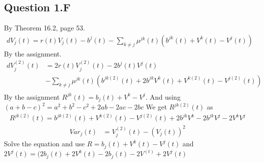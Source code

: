\documentclass[10pt]{article}
\begin{document}
\subsection{Question 1.F}
By Theorem 16.2, page 53. 
\begin{equation}
\begin{split}
dV_j(t) = r(t)V_j(t) - b^j(t) - \sum_{k \neq j} \mu^{jk}(t) (b^{jk}(t) + V^k(t) - V^j(t))
\end{split}
\end{equation}
By the assignment.
\begin{equation}
\begin{split}
dV_j^{(2)}(t) & = 
 2r(t)V_j^{(2)}(t) - 2b^j(t)V^j(t) \\
 & - \sum_{k \neq j} \mu^{jk}(t) (b^{jk(2)}(t) + 2b^{jk}V^k(t) + V^{k(2)}(t) - V^{j(2)}(t)) \\ 
\end{split}
\end{equation}
By the assignment $R^{jk}(t) = b_j(t) + V^k - V^j$. And using $(a+b-c)^2 = a^2 + b^2 - c^2 + 2ab -2ac - 2bc$ We get $R^{jk(2)}(t)$ as
\begin{equation}
\begin{split}
R^{jk(2)}(t) = b^{jk(2)}(t) + V^{k(2)}(t) - V^{j(2)}(t) + 2b^{jk}V^k - 2b^{jk}V^j - 2V^kV^j
\end{split}
\end{equation}
\begin{equation}
\begin{split}
Var_j(t) & = V_j^{(2)}(t) - (V_j(t))^2
\end{split}
\end{equation}
Solve the equation and use $R = b_j(t) + V^k(t) - V^j(t)$ and $2V^j(t) = (2b_j (t) + 2V^k(t) - 2b_j (t) - 2V^(t) + 2V^j(t) $
\end{document}

